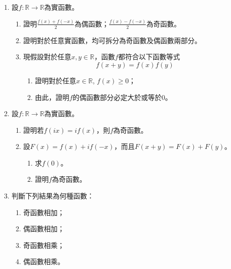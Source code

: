 \documentclass[12pt]{article}
\begin{document}
    \begin{enumerate}
        \item 設$f:\mathbb{R}\to\mathbb{R}$為實函數。\begin{enumerate}
            \item 證明$\frac{f(x)+f(-x)}{2}$為偶函數；$\frac{f(x)-f(-x)}{2}$為奇函數。
            \item 證明對於任意實函數，均可拆分為奇函數及偶函數兩部分。
            \item 現假設對於任意$x,y\in\mathbb{R}$，函數$f$都符合以下函數等式$$f(x+y)=f(x)f(y)$$\begin{enumerate}
                \item 證明對於任意$x\in\mathbb{R}$, $f(x)\geq 0$；
                \item 由此，證明$f$的偶函數部分必定大於或等於$0$。
            \end{enumerate}
        \end{enumerate}
        \item 設$f:\mathbb{R}\to\mathbb{R}$為實函數。\begin{enumerate}
            \item 證明若$f(ix)=if(x)$，則$f$為奇函數。
            \item 設$F(x)=f(x)+if(-x)$，而且$F(x+y)=F(x)+F(y)$。\begin{enumerate}
                \item 求$f(0)$。
                \item 證明$f$為奇函數。
            \end{enumerate}
        \end{enumerate}
        \item 判斷下列結果為何種函數：\begin{enumerate}
            \item 奇函數相加；
            \item 偶函數相加；
            \item 奇函數相乘；
            \item 偶函數相乘。
        \end{enumerate}
    \end{enumerate}
\end{document}
